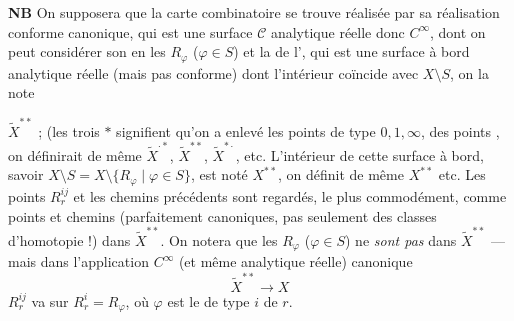 \documentclass[11pt,a4paper]{article}
\begin{document}

\textbf{NB}  On supposera que la carte combinatoire se trouve réalisée par sa réalisation conforme canonique, qui est une surface $\mathcal{C}$ analytique réelle donc $C^\infty$, dont on peut considérer son  en les $R_\varphi$ ($\varphi \in S$) et la  de l', qui est une surface à bord analytique réelle (mais pas conforme) dont l'intérieur coïncide avec $X \setminus S$, on la note

$\tilde X^{\ast\ast}$ ; (les trois $\ast$ signifient qu'on a enlevé  les points de type $0, 1, \infty$, des points   , on définirait de même $\tilde X^{\cdot\ast}$, $\tilde X^{\ast\ast}$, $\tilde X^{\ast\cdot}$, etc. \struck{\ill{}} L'intérieur de cette surface à bord, savoir $X \setminus S = X \setminus \{R_\varphi \mid \varphi \in S\}$, est noté $X^{\ast\ast}$, on définit de même $X^{\ast\ast}$ etc. Les points $R^{ij}_r$ et les chemins précédents sont regardés, le plus commodément, comme points et chemins (parfaitement canoniques, pas seulement des classes d'homotopie !) dans $\tilde X^{\ast\ast}$. On notera que les $R_\varphi$ ($\varphi \in S$) ne \textit{sont pas} dans $\tilde X^{\ast\ast}$ ---
mais dans l'application $C^\infty$ (et même analytique réelle) canonique
\begin{equation*}
  \tag{11} \tilde X^{\ast\ast} \longrightarrow X
\end{equation*}
 $R^{ij}_r$ va sur $R^i_r = R_\varphi$, où $\varphi$ est le   de type $i$ de $r$.
\end{document}
